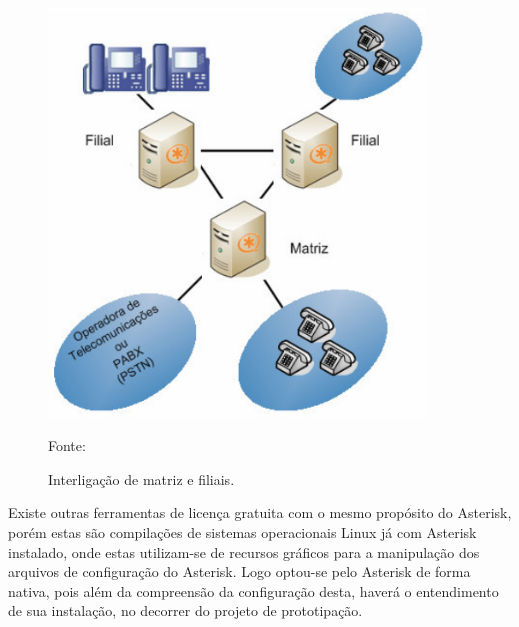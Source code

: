 \begin{figure}[h]
	\centering
	\includegraphics[width=10cm]{imagens/matrizFiliaisAsteirsk.jpg}
	\caption{Interligação de matriz e filiais.}
    \label{Figura15}
    Fonte: \cite{flavioeduardoandredade2005}
\end{figure}

Existe outras ferramentas de licença gratuita com o mesmo propósito do Asterisk, porém estas são compilações de sistemas operacionais Linux já com Asterisk instalado, onde estas utilizam-se de recursos gráficos para a manipulação dos arquivos de configuração do Asterisk. Logo optou-se pelo Asterisk de forma nativa, pois além da compreensão da configuração desta, haverá o entendimento de sua instalação, no decorrer do projeto de prototipação.